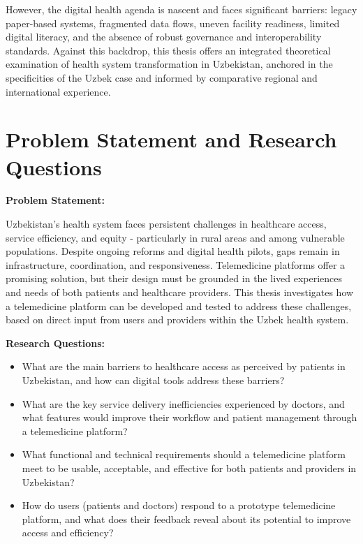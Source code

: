 However, the digital health agenda is nascent and faces significant
barriers: legacy paper-based systems, fragmented data flows, uneven
facility readiness, limited digital literacy, and the absence of robust
governance and interoperability standards. Against this backdrop, this
thesis offers an integrated theoretical examination of health system
transformation in Uzbekistan, anchored in the specificities of the Uzbek
case and informed by comparative regional and international experience.

\section{Problem Statement and Research Questions}\label{problem-statement-and-research-questions}

\textbf{Problem Statement:}

Uzbekistan's health system faces persistent challenges in healthcare
access, service efficiency, and equity - particularly in rural areas and
among vulnerable populations. Despite ongoing reforms and digital health
pilots, gaps remain in infrastructure, coordination, and responsiveness.
Telemedicine platforms offer a promising solution, but their design must
be grounded in the lived experiences and needs of both patients and
healthcare providers. This thesis investigates how a telemedicine
platform can be developed and tested to address these challenges, based
on direct input from users and providers within the Uzbek health system.

\textbf{Research Questions:}

\begin{itemize}
\item
  What are the main barriers to healthcare access as perceived by
  patients in Uzbekistan, and how can digital tools address these
  barriers?
\item
  What are the key service delivery inefficiencies experienced by
  doctors, and what features would improve their workflow and patient
  management through a telemedicine platform?
\item
  What functional and technical requirements should a telemedicine
  platform meet to be usable, acceptable, and effective for both
  patients and providers in Uzbekistan?
\item
  How do users (patients and doctors) respond to a prototype
  telemedicine platform, and what does their feedback reveal about its
  potential to improve access and efficiency?
\end{itemize}

